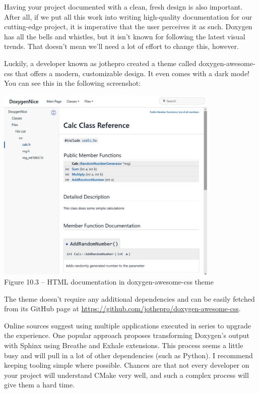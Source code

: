 

Having your project documented with a clean, fresh design is also important. After all, if we put all this work into writing high-quality documentation for our cutting-edge project, it is imperative that the user perceives it as such. Doxygen has all the bells and whistles, but it isn't known for following the latest visual trends. That doesn't mean we'll need a lot of effort to change this, however.

Luckily, a developer known as jothepro created a theme called doxygen-awesome-css that offers a modern, customizable design. It even comes with a dark mode! You can see this in the following screenshot:

\begin{center}
\includegraphics[width=0.8\textwidth]{content/3/chapter10/images/3.jpg}\\
Figure 10.3 – HTML documentation in doxygen-awesome-css theme
\end{center}

The theme doesn't require any additional dependencies and can be easily fetched from its GitHub page at \url{https://github.com/jothepro/doxygen-awesome-css}.

\begin{tcolorbox}[colback=blue!5!white,colframe=blue!75!black,title=Note]
Online sources suggest using multiple applications executed in series to upgrade the experience. One popular approach proposes transforming Doxygen's output with Sphinx using Breathe and Exhale extensions. This process seems a little busy and will pull in a lot of other dependencies (such as Python). I recommend keeping tooling simple where possible. Chances are that not every developer on your project will understand CMake very well, and such a complex process will give them a hard time.
\end{tcolorbox}

